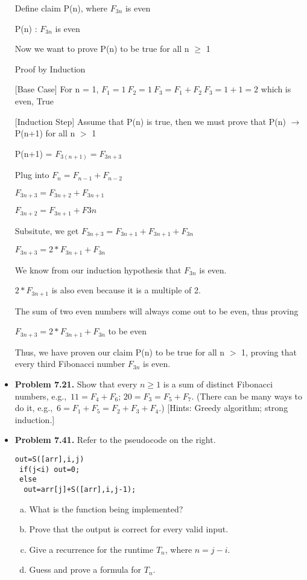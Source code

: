 \documentclass[11pt]{article}
\def\imp{\rightarrow}
\begin{document}
\begin{itemize}
\vspace*{0.1in}

Define claim P(n), where $F_{3n}$ is even

P(n) : $F_{3n}$ is even

Now we want to prove P(n) to be true for all n $\geq$ 1

Proof by Induction

[Base Case] For n = 1, $F_1 = 1 \ F_2 = 1 \ F_3 = F_1 + F_2 \ F_3 = 1 + 1 = 2$ which is even, True 

[Induction Step] Assume that P(n) is true, then we must prove that P(n) $\imp$ P(n+1) for all n $>$ 1

P(n+1) = $F_{3(n+1)} = F_{3n + 3}$

Plug into $F_n = F_{n-1} + F_{n-2}$

$F_{3n+3} = F_{3n+2} + F_{3n + 1}$

$F_{3n+2} = F_{3n+1} + F{3n}$

Subsitute, we get $F_{3n+3} = F_{3n+1} + F_{3n+1} + F_{3n}$

$F_{3n+3} = 2 * F_{3n+1} + F_{3n}$

We know from our induction hypothesis that $F_{3n}$ is even.

$2*F_{3n+1}$ is also even because it is a multiple of 2.

The sum of two even numbers will always come out to be even, thus proving 

$F_{3n+3} = 2 * F_{3n+1} + F_{3n}$ to be even

Thus, we have proven our claim P(n) to be true for all n $>$ 1, proving that every third Fibonacci number $F_{3n}$ is even.

\vspace{0.1in}

\item \textbf{Problem 7.21.}
Show that every $n\ge 1$ is a sum of distinct Fibonacci numbers,
e.g.,~$11=F_4+F_6$; $20=F_3=F_5+F_7$.
(There can be many ways to do it, e.g.,~$6=F_1+F_5=F_2+F_3+F_4$.)
[Hints: Greedy algorithm; strong induction.]

\vspace{0.1in}

\item \textbf{Problem 7.41.}
Refer to the pseudocode on the right.
\begin{verbatim}
out=S([arr],i,j)
 if(j<i) out=0;
 else
  out=arr[j]+S([arr],i,j-1);
\end{verbatim}
\begin{enumerate}[(a)]
\item What is the function being implemented?
\item Prove that the output is correct for every valid input.
\item Give a recurrence for the runtime $T_n$, where $n=j-i$.
\item Guess and prove a formula for $T_n$.
\end{enumerate}


\end{itemize}
\end{document}
